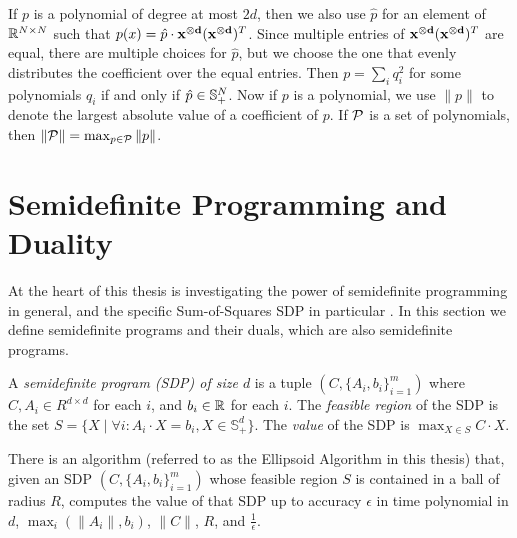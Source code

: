 If $p$ is a polynomial of degree at most $2d$, then we also use $\hat{p}$ for an element of $\mathbb R^{N \times N}$ such that $p(x) = \hat{p} \cdot \mathbf{x^{\otimes d}}(\mathbf{x^{\otimes d}})^T$. Since multiple entries of $\mathbf{x^{\otimes d}}(\mathbf{x^{\otimes d}})^T$ are equal, there are multiple choices for $\hat{p}$,  but we choose the one that evenly distributes the coefficient over the equal entries.  Then $p = \sum_i q_i^2$ for some polynomials $q_i$ if and only if $\hat{p} \in \mathbb{S}^{N}_+$. Now if $p$ is a polynomial, we use $\|p\|$ to denote the largest absolute value of a coefficient of $p$. If $\mathcal P$ is a set of polynomials, then $\|\mathcal P\| = \max_{p \in \mathcal P} \|p\|$.

\section{Semidefinite Programming and Duality}
At the heart of this thesis is investigating the power of semidefinite programming in general, and the specific Sum-of-Squares SDP in particular .
In this section we define semidefinite programs and their duals, which are also semidefinite programs.

\begin{definition}
A \emph{semidefinite program (SDP) of size $d$} is a tuple $(C,\{A_i, b_i\}_{i=1}^m)$ where $C,A_i \in R^{d \times d}$ for each $i$, and $b_i \in \mathbb R$ for each $i$.
The \emph{feasible region} of the SDP is the set $S = \{X \mid \forall i: A_i \cdot X = b_i, X \in \mathbb{S}_+^d\}$.
The \emph{value} of the SDP is $\max_{X\in S} C \cdot X$.
\end{definition}
\begin{fact}
There is an algorithm (referred to as the Ellipsoid Algorithm in this thesis) that, given an SDP $(C, \{A_i,b_i\}_{i=1}^m)$ whose feasible region $S$ is contained in a ball of radius $R$, computes the value of that SDP up to accuracy $\epsilon$ in time polynomial in $d$, $\max_i\left(\|A_i\|,b_i\right)$, $\|C\|$, $R$, and $\frac{1}{\epsilon}$.
\end{fact}

